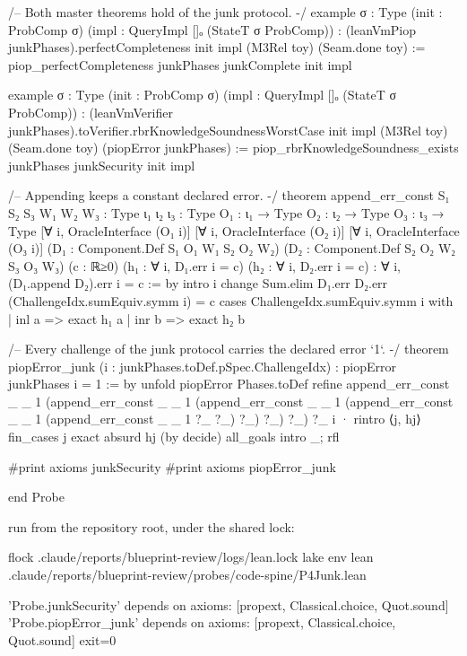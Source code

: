 \begin{leancode}
/-- Both master theorems hold of the junk protocol. -/
example {σ : Type} (init : ProbComp σ) (impl : QueryImpl []ₒ (StateT σ ProbComp)) :
    (leanVmPiop junkPhases).perfectCompleteness init impl (M3Rel toy) (Seam.done toy) :=
  piop_perfectCompleteness junkPhases junkComplete init impl

example {σ : Type} (init : ProbComp σ) (impl : QueryImpl []ₒ (StateT σ ProbComp)) :
    (leanVmVerifier junkPhases).toVerifier.rbrKnowledgeSoundnessWorstCase init impl (M3Rel toy)
      (Seam.done toy) (piopError junkPhases) :=
  piop_rbrKnowledgeSoundness_exists junkPhases junkSecurity init impl

/-- Appending keeps a constant declared error. -/
theorem append_err_const {S₁ S₂ S₃ W₁ W₂ W₃ : Type} {ι₁ ι₂ ι₃ : Type} {O₁ : ι₁ → Type}
    {O₂ : ι₂ → Type} {O₃ : ι₃ → Type} [∀ i, OracleInterface (O₁ i)]
    [∀ i, OracleInterface (O₂ i)] [∀ i, OracleInterface (O₃ i)]
    (D₁ : Component.Def S₁ O₁ W₁ S₂ O₂ W₂) (D₂ : Component.Def S₂ O₂ W₂ S₃ O₃ W₃) (c : ℝ≥0)
    (h₁ : ∀ i, D₁.err i = c) (h₂ : ∀ i, D₂.err i = c) : ∀ i, (D₁.append D₂).err i = c := by
  intro i
  change Sum.elim D₁.err D₂.err (ChallengeIdx.sumEquiv.symm i) = c
  cases ChallengeIdx.sumEquiv.symm i with
  | inl a => exact h₁ a
  | inr b => exact h₂ b

/-- Every challenge of the junk protocol carries the declared error `1`. -/
theorem piopError_junk (i : junkPhases.toDef.pSpec.ChallengeIdx) : piopError junkPhases i = 1 := by
  unfold piopError Phases.toDef
  refine append_err_const _ _ 1 (append_err_const _ _ 1 (append_err_const _ _ 1
    (append_err_const _ _ 1 (append_err_const _ _ 1 ?_ ?_) ?_) ?_) ?_) ?_ i
  · rintro ⟨j, hj⟩
    fin_cases j
    exact absurd hj (by decide)
  all_goals intro _; rfl

#print axioms junkSecurity
#print axioms piopError_junk

end Probe
\end{leancode}

run from the repository root, under the shared lock:

\begin{shellcode}
flock .claude/reports/blueprint-review/logs/lean.lock lake env lean .claude/reports/blueprint-review/probes/code-spine/P4Junk.lean
\end{shellcode}


\begin{srccode}
'Probe.junkSecurity' depends on axioms: [propext, Classical.choice, Quot.sound]
'Probe.piopError_junk' depends on axioms: [propext, Classical.choice, Quot.sound]
exit=0
\end{srccode}

